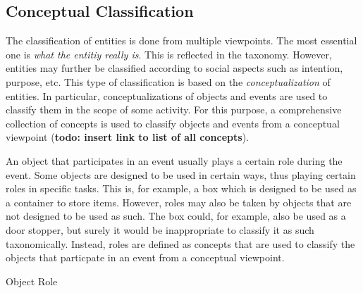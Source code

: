\subsection{Conceptual Classification}
\label{sec:classification}

The classification of entities is done from multiple viewpoints.
The most essential one is \emph{what the entitiy really is}.
This is reflected in the taxonomy.
However, entities may further be classified according to social aspects such as intention, purpose, etc.
This type of classification is based on the \emph{conceptualization} of entities.
In particular, conceptualizations of objects and events are used to classify them in the scope of some activity.
For this purpose,
a comprehensive collection of concepts is used to classify objects and events from a conceptual viewpoint (\textbf{todo: insert link to list of all concepts}).

An object that participates in an event usually plays a certain role during the event.
Some objects are designed to be used in certain ways, thus playing certain roles in specific tasks.
This is, for example, a box which is designed to be used as a container to store items.
However, roles may also be taken by objects that are not designed to be used as such.
The box could, for example, also be used as a door stopper, but surely it would be
inappropriate to classify it as such taxonomically.
Instead, roles are defined as concepts that are used to classify the objects that particpate in an event from a conceptual viewpoint.

\begin{ODP}{Object Role}
\end{ODP}

